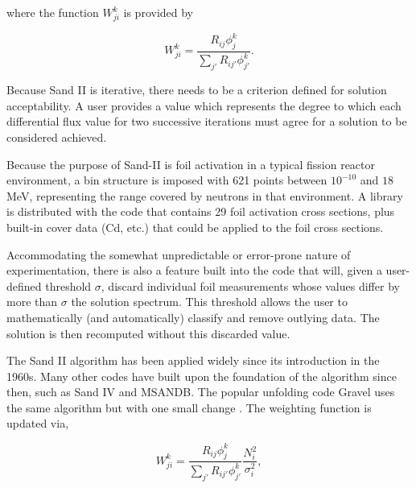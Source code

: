 \noindent
where the function $W_{ji}^k$ is provided by

\begin{equation}
\label{eqn:sandii-w}
W_{ji}^k = \frac{R_{ij} \phi_{j}^k}{\sum_{j'} R_{ij'} \phi_{j'}^k} .
\end{equation}

Because Sand II is iterative, there needs to be a criterion defined for solution acceptability.
A user provides a value which represents the degree to which each differential flux value for two successive iterations must agree for a solution to be considered achieved.

Because the purpose of Sand-II is foil activation in a typical fission reactor environment, a bin structure is imposed with 621 points between $10^{-10}$ and $18$ MeV, representing the range covered by neutrons in that environment.
A library is distributed with the code that contains 29 foil activation cross sections, plus built-in cover data (Cd, etc.) that could be applied to the foil cross sections.

Accommodating the somewhat unpredictable or error-prone nature of experimentation, there is also a feature built into the code that will, given a user-defined threshold $\sigma$, discard individual foil measurements whose values differ by more than $\sigma$ the solution spectrum.
This threshold allows the user to mathematically (and automatically) classify and remove outlying data.
The solution is then recomputed without this discarded value.

The Sand II algorithm has been applied widely since its introduction in the 1960s.
Many other codes have built upon the foundation of the algorithm since then, such as Sand IV and MSANDB.
The popular unfolding code Gravel uses the same algorithm but with one small change \cite{reginatto2004umg}.
The weighting function is updated via,

\begin{equation}
\label{eqn:gravel-w}
W_{ji}^k = \frac{R_{ij} \phi_{j}^k}{\sum_{j'} R_{ij'} \phi_{j'}^k} \frac{N_i^2}{\sigma_i^2} ,
\end{equation}

